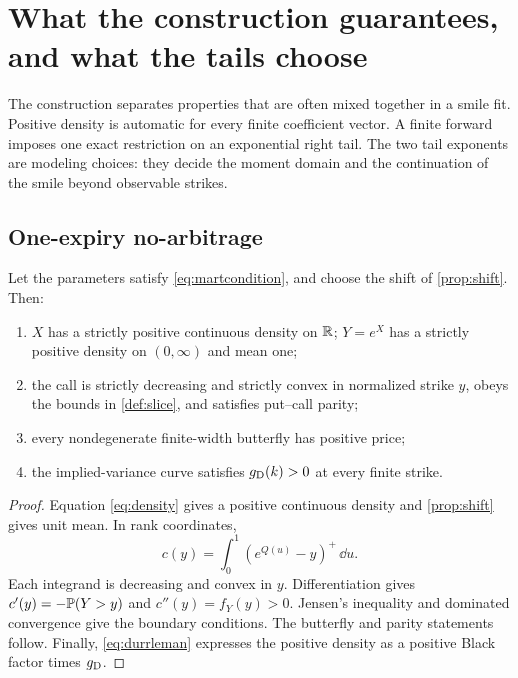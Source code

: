 \section{What the construction guarantees, and what the tails choose}
\label{sec:validity}

The construction separates properties that are often mixed together in a
smile fit.  Positive density is automatic for every finite coefficient
vector.  A finite forward imposes one exact restriction on an exponential
right tail.  The two tail exponents are modeling choices: they decide the
moment domain and the continuation of the smile beyond observable strikes.

\subsection{One-expiry no-arbitrage}

\begin{proposition}
\label{prop:noarb}
Let the parameters satisfy \eqref{eq:martcondition}, and choose the shift of
\cref{prop:shift}.  Then:
\begin{enumerate}[label=(\roman*)]
\item $X$ has a strictly positive continuous density on $\mathbb{R}$;
$Y=e^X$ has a strictly positive density on $(0,\infty)$ and mean one;
\item the call is strictly decreasing and strictly convex in normalized
strike $y$, obeys the bounds in \cref{def:slice}, and satisfies put--call
parity;
\item every nondegenerate finite-width butterfly has positive price;
\item the implied-variance curve satisfies $g_{\rm D}(k)>0$ at every finite
strike.
\end{enumerate}
\end{proposition}

\begin{proof}
Equation \eqref{eq:density} gives a positive continuous density and
\cref{prop:shift} gives unit mean.  In rank coordinates,
\[
c(y)=\int_0^1(e^{Q(u)}-y)^+\,\dd u.
\]
Each integrand is decreasing and convex in $y$.  Differentiation gives
$c'(y)=-\mathbb{P}(Y>y)$ and $c''(y)=f_Y(y)>0$.  Jensen's inequality and
dominated convergence give the boundary conditions.  The butterfly and
parity statements follow.  Finally, \eqref{eq:durrleman} expresses the
positive density as a positive Black factor times $g_{\rm D}$.
\end{proof}

